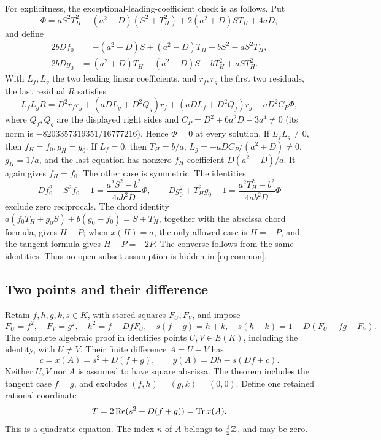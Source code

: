 \documentclass[11pt,a4paper]{article}
\begin{document}
For explicitness, the exceptional-leading-coefficient check is as
follows. Put
\[
 \Phi=aS^2T_H^2-(a^2-D)(S^2+T_H^2)+2(a^2+D)ST_H+4aD,
\]
and define
\begin{align*}
2bDf_0&=-(a^2+D)S+(a^2-D)T_H-bS^2-aS^2T_H,\\
2bDg_0&=(a^2+D)T_H-(a^2-D)S-bT_H^2+aST_H^2.
\end{align*}
With $L_f,L_g$ the two leading linear coefficients, and $r_f,r_g$
the first two residuals, the last residual $R$ satisfies
\[
L_fL_gR=D^2r_fr_g+(aDL_g+D^2Q_g)r_f+(aDL_f+D^2Q_f)r_g
                 -aD^2C_P\Phi,
\]
where $Q_f,Q_g$ are the displayed right sides and
$C_P=D^2+6a^2D-3a^4\ne0$ (its norm is
$-8203357319351/16777216$). Hence $\Phi=0$ at every solution.
If $L_fL_g\ne0$, then $f_H=f_0,g_H=g_0$. If $L_f=0$, then
$T_H=b/a$, $L_g=-aDC_P/(a^2+D)\ne0$, $g_H=1/a$, and the last
equation has nonzero $f_H$ coefficient $D(a^2+D)/a$. It again gives
$f_H=f_0$. The other case is symmetric. The identities
\[
 Df_0^2+S^2f_0-1=\frac{a^2S^2-b^2}{4ab^2D}\Phi,
 \qquad
 Dg_0^2+T_H^2g_0-1=\frac{a^2T_H^2-b^2}{4ab^2D}\Phi
\]
exclude zero reciprocals. The chord identity
$a(f_0T_H+g_0S)+b(g_0-f_0)=S+T_H$, together with the abscissa
chord formula, gives $H-P$; when $x(H)=a$, the only allowed case
is $H=-P$, and the tangent formula gives $H-P=-2P$.
The converse follows from the same identities. Thus no open-subset
assumption is hidden in \eqref{eq:common}.

\subsection{Two points and their difference}
Retain $f,h,g,k,s\in K$, with stored squares $F_U,F_V$, and impose
\begin{equation}\label{eq:pair}
 F_U=f^2,\quad F_V=g^2,\quad h^2=f-DfF_U,\quad
 s(f-g)=h+k,\quad s(h-k)=1-D(F_U+fg+F_V).
\end{equation}
The complete algebraic proof in \cite[Proposition 2.1]{TraceAll}
identifies points $U,V\in E(K)$, including the identity, with
$U\ne V$. Their finite difference $A=U-V$ has
\[
 c=x(A)=s^2+D(f+g),\qquad y(A)=Dh-s(Df+c).
\]
Neither $U,V$ nor $A$ is assumed to have square abscissa. The theorem
includes the tangent case $f=g$, and excludes $(f,h)=(g,k)=(0,0)$.
Define one retained rational coordinate
\begin{equation}\label{eq:traceheightcoord}
                           T=2\operatorname{Re}(s^2+D(f+g))=\operatorname{Tr} x(A).
\end{equation}
This is a quadratic equation. The index $n$ of $A$ belongs to
$\frac12\mathbb Z$, and may be zero.
\end{document}
